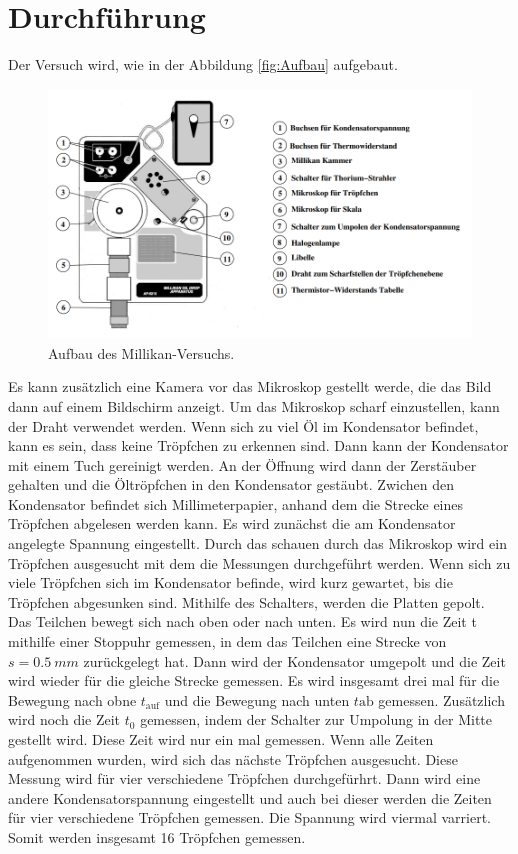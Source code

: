 \section{Durchführung}
\label{sec:Durchführung}

Der Versuch wird, wie in der Abbildung \ref{fig:Aufbau} aufgebaut.
\begin{figure}[H]
    \centering
    \includegraphics[scale=0.5]{content/Aufbau.png}
    \caption{Aufbau des Millikan-Versuchs.}
    \label{fig:Ftröpfchen}
\end{figure}

Es kann zusätzlich eine Kamera vor das Mikroskop gestellt werde, die das Bild dann auf einem Bildschirm anzeigt.
Um das Mikroskop scharf einzustellen, kann der Draht verwendet werden.
Wenn sich zu viel Öl im Kondensator befindet, kann es sein, dass keine Tröpfchen zu erkennen sind.
Dann kann der Kondensator mit einem Tuch gereinigt werden.
An der Öffnung wird dann der Zerstäuber gehalten und die Öltröpfchen in den Kondensator gestäubt.
Zwichen den Kondensator befindet sich Millimeterpapier, anhand dem die Strecke eines Tröpfchen abgelesen werden kann.
Es wird zunächst die am Kondensator angelegte Spannung eingestellt.
Durch das schauen durch das Mikroskop wird ein Tröpfchen ausgesucht mit dem die Messungen durchgeführt werden.
Wenn sich zu viele Tröpfchen sich im Kondensator befinde, wird kurz gewartet, bis die Tröpfchen abgesunken sind.
Mithilfe des Schalters, werden die Platten gepolt. Das Teilchen bewegt sich nach oben oder nach unten.
Es wird nun die Zeit t mithilfe einer Stoppuhr gemessen, in dem das Teilchen eine Strecke von $s = \qty{0.5}{mm}$ zurückgelegt hat.
Dann wird der Kondensator umgepolt und die Zeit wird wieder für die gleiche Strecke gemessen.
Es wird insgesamt drei mal für die Bewegung nach obne $t_\text{auf}$ und die Bewegung nach unten $t\text{ab}$ gemessen.
Zusätzlich wird noch die Zeit $t_0$ gemessen, indem der Schalter zur Umpolung in der Mitte gestellt wird.
Diese Zeit wird nur ein mal gemessen.
Wenn alle Zeiten aufgenommen wurden, wird sich das nächste Tröpfchen ausgesucht.
Diese Messung wird für vier verschiedene Tröpfchen durchgefürhrt.
Dann wird eine andere Kondensatorspannung eingestellt und auch bei dieser werden die Zeiten für vier verschiedene Tröpfchen gemessen.
Die Spannung wird viermal varriert.
Somit werden insgesamt 16 Tröpfchen gemessen.
